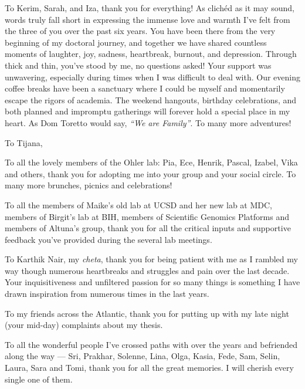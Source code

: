 \begin{acknowledgements}
\par To Kerim, Sarah, and Iza, thank you for everything! As clichéd as it may sound, words truly fall short in expressing the immense love and warmth I've felt from the three of you over the past six years. You have been there from the very beginning of my doctoral journey, and together we have shared countless moments of laughter, joy, sadness, heartbreak, burnout, and depression. Through thick and thin, you've stood by me, no questions asked! Your support was unwavering, especially during times when I was difficult to deal with. Our evening coffee breaks have been a sanctuary where I could be myself and momentarily escape the rigors of academia. The weekend hangouts, birthday celebrations, and both planned and impromptu gatherings will forever hold a special place in my heart. As Dom Toretto would say, \textit{``We are Family''}. To many more adventures!   \\

\par To Tijana, \\

\par To all the lovely members of the Ohler lab: Pia, Ece, Henrik, Pascal, Izabel, Vika and others, thank you for adopting me into your group and your social circle. To many more brunches, picnics and celebrations!\\

\par To all the members of Maike's old lab at UCSD and her new lab at MDC, members of Birgit's lab at BIH, members of Scientific Genomics Platforms and members of Altuna's group, thank you for all the critical inputs and supportive feedback you've provided during the several lab meetings.\\

\par To Karthik Nair, my \textit{cheta}, thank you for being patient with me as I rambled my way though numerous heartbreaks and struggles and pain over the last decade. Your inquisitiveness and unfiltered passion for so many things is something I have drawn inspiration from numerous times in the last years.\\

\par To my friends across the Atlantic, thank you for putting up with my late night (your mid-day) complaints about my thesis.\\


\par To all the wonderful people I've crossed paths with over the years and befriended along the way — Sri, Prakhar, Solenne, Lina, Olga, Kasia, Fede, Sam, Selin, Laura, Sara and Tomi, thank you for all the great memories. I will cherish every single one of them.\\


\end{acknowledgements}

